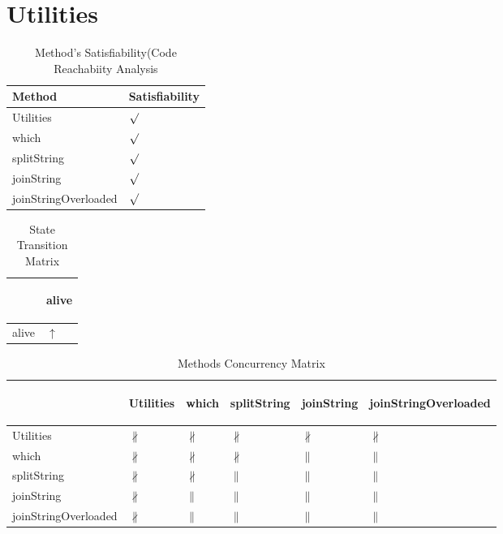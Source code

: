 \documentclass[10pt]{article}
\begin{document}
\section{{\color{Fuchsia}Utilities}}
\label{Utilities}
\begin{longtable}{|l|l|}
\caption{Method's Satisfiability(Code Reachabiity Analysis}\\
\hline
Method & Satisfiability\\
\hline
Utilities&{\color{blue}$\surd$}\\
\hline
which&{\color{blue}$\surd$}\\
\hline
splitString&{\color{blue}$\surd$}\\
\hline
joinString&{\color{blue}$\surd$}\\
\hline
joinStringOverloaded&{\color{blue}$\surd$}\\
\hline
\end{longtable}
\begin{longtable}{|l|l|}
\caption{State Transition Matrix}\\
\hline
&\begin{sideways}alive\end{sideways}\\
\hline
alive&{\color{blue}$\uparrow$}\\
\hline
\end{longtable}
\begin{longtable}{|l|l|l|l|l|l|}
\caption{Methods Concurrency Matrix}\\
\hline
&\begin{sideways}Utilities\end{sideways}&\begin{sideways}which\end{sideways}&\begin{sideways}splitString\end{sideways}&\begin{sideways}joinString\end{sideways}&\begin{sideways}joinStringOverloaded\end{sideways}\\
\hline
Utilities&{\color{BrickRed}$\nparallel$}&{\color{BrickRed}$\nparallel$}&{\color{BrickRed}$\nparallel$}&{\color{BrickRed}$\nparallel$}&{\color{BrickRed}$\nparallel$}\\
\hline
which&{\color{BrickRed}$\nparallel$}&{\color{BrickRed}$\nparallel$}&{\color{BrickRed}$\nparallel$}&{\color{blue}$\parallel$}&{\color{blue}$\parallel$}\\
\hline
splitString&{\color{BrickRed}$\nparallel$}&{\color{BrickRed}$\nparallel$}&{\color{blue}$\parallel$}&{\color{blue}$\parallel$}&{\color{blue}$\parallel$}\\
\hline
joinString&{\color{BrickRed}$\nparallel$}&{\color{blue}$\parallel$}&{\color{blue}$\parallel$}&{\color{blue}$\parallel$}&{\color{blue}$\parallel$}\\
\hline
joinStringOverloaded&{\color{BrickRed}$\nparallel$}&{\color{blue}$\parallel$}&{\color{blue}$\parallel$}&{\color{blue}$\parallel$}&{\color{blue}$\parallel$}\\
\hline
\end{longtable}
\newpage
\end{document}
